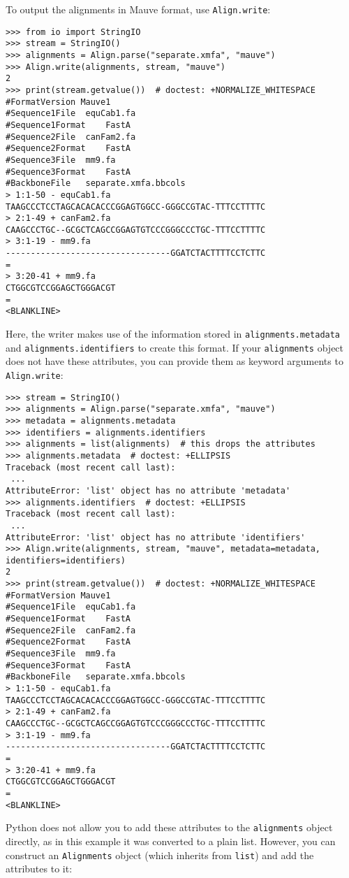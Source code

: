 To output the alignments in Mauve format, use \verb|Align.write|:
\begin{verbatim}
>>> from io import StringIO
>>> stream = StringIO()
>>> alignments = Align.parse("separate.xmfa", "mauve")
>>> Align.write(alignments, stream, "mauve")
2
>>> print(stream.getvalue())  # doctest: +NORMALIZE_WHITESPACE
#FormatVersion Mauve1
#Sequence1File	equCab1.fa
#Sequence1Format	FastA
#Sequence2File	canFam2.fa
#Sequence2Format	FastA
#Sequence3File	mm9.fa
#Sequence3Format	FastA
#BackboneFile	separate.xmfa.bbcols
> 1:1-50 - equCab1.fa
TAAGCCCTCCTAGCACACACCCGGAGTGGCC-GGGCCGTAC-TTTCCTTTTC
> 2:1-49 + canFam2.fa
CAAGCCCTGC--GCGCTCAGCCGGAGTGTCCCGGGCCCTGC-TTTCCTTTTC
> 3:1-19 - mm9.fa
---------------------------------GGATCTACTTTTCCTCTTC
=
> 3:20-41 + mm9.fa
CTGGCGTCCGGAGCTGGGACGT
=
<BLANKLINE>
\end{verbatim}
Here, the writer makes use of the information stored in \verb+alignments.metadata+ and \verb+alignments.identifiers+ to create this format.
If your \verb|alignments| object does not have these attributes, you can provide them as keyword arguments to \verb+Align.write+:
\begin{verbatim}
>>> stream = StringIO()
>>> alignments = Align.parse("separate.xmfa", "mauve")
>>> metadata = alignments.metadata
>>> identifiers = alignments.identifiers
>>> alignments = list(alignments)  # this drops the attributes
>>> alignments.metadata  # doctest: +ELLIPSIS
Traceback (most recent call last):
 ...
AttributeError: 'list' object has no attribute 'metadata'
>>> alignments.identifiers  # doctest: +ELLIPSIS
Traceback (most recent call last):
 ...
AttributeError: 'list' object has no attribute 'identifiers'
>>> Align.write(alignments, stream, "mauve", metadata=metadata, identifiers=identifiers)
2
>>> print(stream.getvalue())  # doctest: +NORMALIZE_WHITESPACE
#FormatVersion Mauve1
#Sequence1File	equCab1.fa
#Sequence1Format	FastA
#Sequence2File	canFam2.fa
#Sequence2Format	FastA
#Sequence3File	mm9.fa
#Sequence3Format	FastA
#BackboneFile	separate.xmfa.bbcols
> 1:1-50 - equCab1.fa
TAAGCCCTCCTAGCACACACCCGGAGTGGCC-GGGCCGTAC-TTTCCTTTTC
> 2:1-49 + canFam2.fa
CAAGCCCTGC--GCGCTCAGCCGGAGTGTCCCGGGCCCTGC-TTTCCTTTTC
> 3:1-19 - mm9.fa
---------------------------------GGATCTACTTTTCCTCTTC
=
> 3:20-41 + mm9.fa
CTGGCGTCCGGAGCTGGGACGT
=
<BLANKLINE>
\end{verbatim}
Python does not allow you to add these attributes to the \verb+alignments+ object directly, as in this example it was converted to a plain list.
However, you can construct an \verb|Alignments| object (which inherits from \verb+list+) and add the attributes to it:
